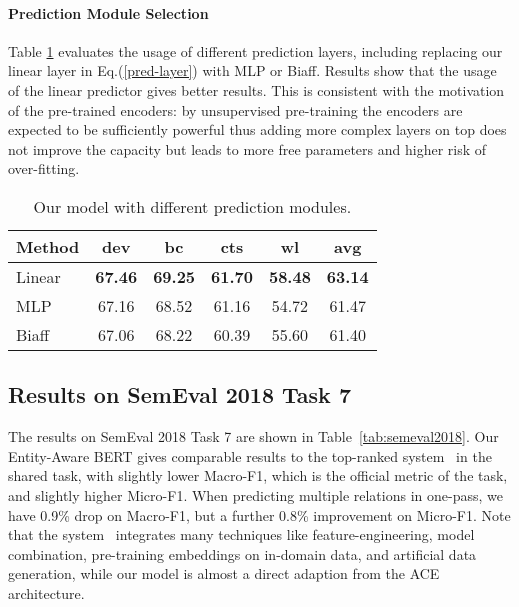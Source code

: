 \documentclass[11pt,a4paper]{article}
\begin{document}
\paragraph{Prediction Module Selection}
Table \ref{tab:prediction_ablation} evaluates the usage of different prediction layers, including replacing our linear layer in Eq.(\ref{pred-layer}) with MLP or Biaff. Results show that the usage of the linear predictor gives better results. This is consistent with the motivation of the pre-trained encoders: by unsupervised pre-training the encoders are expected to be sufficiently powerful thus adding more complex layers on top does not improve the capacity but leads to more free parameters and higher risk of over-fitting.

\begin{table}[!t]
\small
\centering
\begin{tabular}{lccccc}
\toprule
\textbf{Method}                                      & \textbf{dev} & \textbf{bc} & \textbf{cts} & \textbf{wl} & \textbf{avg} \\ \midrule
Linear            & \bf 67.46        & \bf 69.25          & \bf 61.70          & \textbf{58.48} & \textbf{63.14} \\
MLP &    67.16 & 68.52 & 61.16 & 54.72 & 61.47  \\ 
Biaff&   67.06 & 68.22 & 60.39 & 55.60 & 61.40 \\ 
\bottomrule
\end{tabular}
\caption{\small Our model with different prediction modules.}
\label{tab:prediction_ablation}
\end{table}

\subsection{Results on SemEval 2018 Task 7}

The results on SemEval 2018 Task 7 are shown in Table~\ref{tab:semeval2018}.
Our Entity-Aware BERT gives comparable results to the top-ranked system~\cite{rotsztejn-etal-2018-eth} in the shared task, with slightly lower Macro-F1, which is the official metric of the task, and slightly higher Micro-F1.
When predicting multiple relations in one-pass, we have 0.9\% drop on Macro-F1, but a further 0.8\% improvement on Micro-F1.
Note that the system~\cite{rotsztejn-etal-2018-eth} integrates many techniques like feature-engineering, model combination, pre-training embeddings on in-domain data, and artificial data generation, while our model is almost a direct adaption from the ACE architecture.
\end{document}

